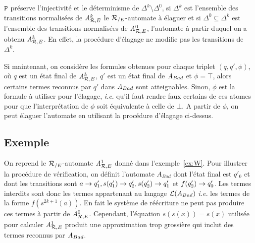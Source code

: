 \begin{remark}
   $\mathtt{P}$ préserve l'injectivité et le déterminisme de $\Delta^k \setminus \Delta^0$, 
   si $\Delta^k$ est l'ensemble des transitions normalisées de ${\mathit A}_{\mathcal R,E}^k$ le ${\mathcal R_{/E}}$-automate à élaguer
   et si $\Delta^0 \subseteq \Delta^k$ est l'ensemble des transitions normalisées de ${\mathit A}_{\mathcal R,E}^0$, l'automate
   à partir duquel on a obtenu ${\mathit A}_{\mathcal R,E}^k$.
   En effet, la procédure d'élagage ne modifie pas les transitions de $\Delta^k$.
 \end{remark}


Si maintenant, on considère les formules obtenues 
pour chaque triplet $(q,q',\phi)$, où $q$ est un état final de
${\mathit A}_{\mathcal R,E}^k$, $q'$ est un état final de $\mathit A_{Bad}$ et $\phi = \top$, alors
certains termes reconnus par $q'$ dans $\mathit A_{Bad}$ sont atteignables.
Sinon, $\phi$ est la formule à utiliser pour l'élagage, \textit{i.e.} qu'il faut rendre faux
certains de ces atomes pour que l'interprétation de $\phi$ soit équivalente à celle de $\bot$. A partir de $\phi$, on peut
élaguer l'automate en utilisant la procédure d'élagage ci-dessus.


\subsection{Exemple}
On reprend le ${\mathcal R_{/E}}$-automate ${\mathit A}_{\mathcal R,E}^1$ donné dans l'exemple~\ref{ex:W}.
Pour illustrer la procédure de vérification, on définit l'automate
$A_{Bad}$ dont l'état final est $q'_0$ et dont les transitions sont
 $a\rightarrow q'_1, s(q'_1)\rightarrow q'_2, s(q'_2)\rightarrow q'_1$ et $f(q'_2)\rightarrow q'_0$. 
Les termes interdits sont donc les termes appartenant au langage
$\mathcal{L}(A_{Bad})$ \textit{i.e.} les termes de la forme  $f(s^{2k + 1}(a))$.
En fait le système de réécriture ne peut pas produire ces termes 
à partir de ${\mathit A}_{\mathcal R,E}^0$. Cependant, l'équation $s(s(x))=s(x)$ 
utilisée pour calculer ${\mathit A}_{\mathcal R,E}^1$ produit une approximation trop grossière
qui inclut des termes reconnus par $\mathit A_{Bad}$.

